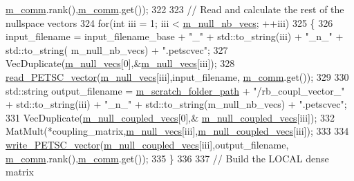 \begin{DoxyCode}
      \hyperlink{classcarl_1_1_f_e_t_i___operations_a8cb0ed286667fc9f3ebc2d8ef2a3e13b}{m\_comm}.rank(),\hyperlink{classcarl_1_1_f_e_t_i___operations_a8cb0ed286667fc9f3ebc2d8ef2a3e13b}{m\_comm}.get());
322 
323     \textcolor{comment}{// Read and calculate the rest of the nullspace vectors}
324     \textcolor{keywordflow}{for}(\textcolor{keywordtype}{int} iii = 1; iii < \hyperlink{classcarl_1_1_f_e_t_i___operations_a6be71b08544858c4b4609bf2a2927a17}{m\_null\_nb\_vecs}; ++iii)
325     \{
326         input\_filename = input\_filename\_base + \textcolor{stringliteral}{"\_"} + std::to\_string(iii) + \textcolor{stringliteral}{"\_n\_"} + std::to\_string(
      m\_null\_nb\_vecs) + \textcolor{stringliteral}{".petscvec"};
327         VecDuplicate(\hyperlink{classcarl_1_1_f_e_t_i___operations_a81ca84aa058155a0a0f586625c6f93b7}{m\_null\_vecs}[0],&\hyperlink{classcarl_1_1_f_e_t_i___operations_a81ca84aa058155a0a0f586625c6f93b7}{m\_null\_vecs}[iii]);
328         \hyperlink{namespacecarl_a4d0e2c60b0765dc8182c95362c5d329a}{read\_PETSC\_vector}(\hyperlink{classcarl_1_1_f_e_t_i___operations_a81ca84aa058155a0a0f586625c6f93b7}{m\_null\_vecs}[iii],input\_filename, 
      \hyperlink{classcarl_1_1_f_e_t_i___operations_a8cb0ed286667fc9f3ebc2d8ef2a3e13b}{m\_comm}.get());
329 
330         std::string output\_filename = \hyperlink{classcarl_1_1_f_e_t_i___operations_ad6d35bc9b5221d45452fbc8931f22055}{m\_scratch\_folder\_path} + \textcolor{stringliteral}{"/rb\_coupl\_vector\_"} + 
      std::to\_string(iii) + \textcolor{stringliteral}{"\_n\_"} + std::to\_string(m\_null\_nb\_vecs) + \textcolor{stringliteral}{".petscvec"};
331         VecDuplicate(\hyperlink{classcarl_1_1_f_e_t_i___operations_a162af22ae7e7410cf5ce6fe07f301e63}{m\_null\_coupled\_vecs}[0],&
      \hyperlink{classcarl_1_1_f_e_t_i___operations_a162af22ae7e7410cf5ce6fe07f301e63}{m\_null\_coupled\_vecs}[iii]);
332         MatMult(*coupling\_matrix,\hyperlink{classcarl_1_1_f_e_t_i___operations_a81ca84aa058155a0a0f586625c6f93b7}{m\_null\_vecs}[iii],\hyperlink{classcarl_1_1_f_e_t_i___operations_a162af22ae7e7410cf5ce6fe07f301e63}{m\_null\_coupled\_vecs}[iii]);
333 
334         \hyperlink{namespacecarl_a1632084ec1f296b63559648cc9c2047f}{write\_PETSC\_vector}(\hyperlink{classcarl_1_1_f_e_t_i___operations_a162af22ae7e7410cf5ce6fe07f301e63}{m\_null\_coupled\_vecs}[iii],output\_filename,
      \hyperlink{classcarl_1_1_f_e_t_i___operations_a8cb0ed286667fc9f3ebc2d8ef2a3e13b}{m\_comm}.rank(),\hyperlink{classcarl_1_1_f_e_t_i___operations_a8cb0ed286667fc9f3ebc2d8ef2a3e13b}{m\_comm}.get());
335     \}
336 
337     \textcolor{comment}{// Build the LOCAL dense matrix}

\end{DoxyCode}

